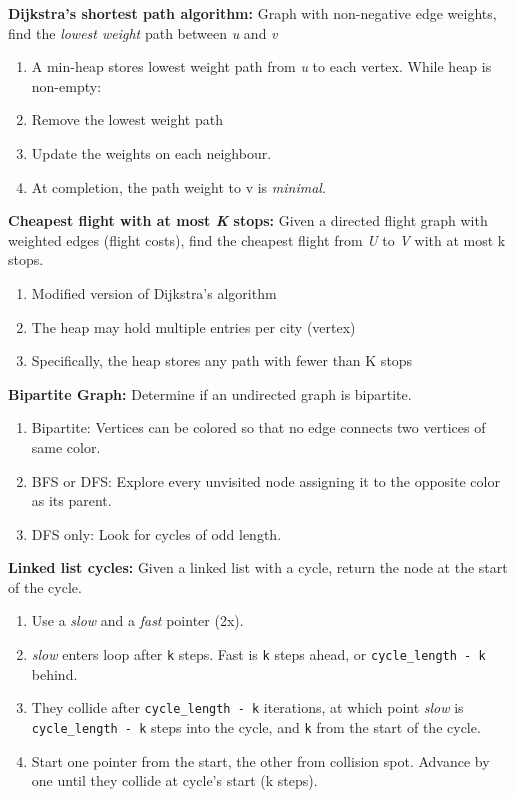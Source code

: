 \documentclass[12pt]{article}
\begin{document}
\vspace{5mm}
\noindent
\textbf{Dijkstra's shortest path algorithm:}
Graph with non-negative edge weights, find the \emph{lowest weight} path between \emph{u} and \emph{v}
\begin{enumerate}
\item A min-heap stores lowest weight path from \emph{u} to each vertex.
While heap is non-empty:
\item Remove the lowest weight path
\item Update the weights on each neighbour.
\item At completion, the path weight to v is \emph{minimal}. 
\end{enumerate}

\vspace{5mm}
\noindent
\textbf{Cheapest flight with at most \emph{K} stops:}
Given a directed flight graph with weighted edges (flight costs), find the cheapest flight from \emph{U} to \emph{V} with at most k stops.
\begin{enumerate}
\item Modified version of Dijkstra's algorithm
\item The heap may hold multiple entries per city (vertex)
\item Specifically, the heap stores any path with fewer than K stops
\end{enumerate}

\vspace{5mm}
\noindent
\textbf{Bipartite Graph:}
Determine if an undirected graph is bipartite.
\begin{enumerate}
\item Bipartite: Vertices can be colored so that no edge connects two vertices of same color.
\item BFS or DFS: Explore every unvisited node assigning it to the opposite color as its parent.
\item DFS only: Look for cycles of odd length.
\end{enumerate}


\vspace{5mm}
\noindent
\textbf{Linked list cycles:}
Given a linked list with a cycle, return the node at the start of the cycle.
\begin{enumerate}
\item Use a \emph{slow} and a \emph{fast} pointer (2x).
\item \emph{slow} enters loop after \texttt{k} steps. Fast is \texttt{k} steps ahead,
or \texttt{cycle\_length - k} behind.
\item They collide after \texttt{cycle\_length - k} iterations, at which point \emph{slow} is 
\texttt{cycle\_length - k} steps into the cycle, and \texttt{k} from the start of the cycle.
\item Start one pointer from the start, the other from collision spot. Advance by one until they collide at cycle's start (k steps).
\end{enumerate}
\end{document}
